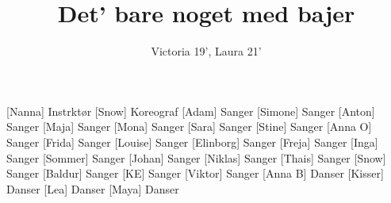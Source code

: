 \documentclass[a4paper,11pt]{article}
\title{Det' bare noget med bajer}
\author{Victoria 19', Laura 21'}
\begin{document}
\maketitle

\begin{roles}
[Nanna] Instrktør
[Snow] Koreograf
[Adam] Sanger
[Simone] Sanger
[Anton] Sanger
[Maja] Sanger
[Mona] Sanger
[Sara] Sanger
[Stine] Sanger
[Anna O] Sanger
[Frida] Sanger
[Louise] Sanger
[Elinborg] Sanger
[Freja] Sanger
[Inga] Sanger
[Sommer] Sanger
[Johan] Sanger
[Niklas] Sanger
[Thais] Sanger
[Snow] Sanger
[Baldur] Sanger
[KE] Sanger
[Viktor] Sanger
[Anna B] Danser
[Kisser] Danser
[Lea] Danser
[Maya] Danser
\end{roles}
\end{document}
